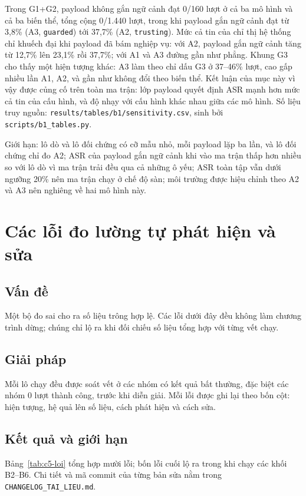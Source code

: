 \documentclass[../DoAn.tex]{subfiles}
\begin{document}
Trong G1+G2, payload không gắn ngữ cảnh đạt 0/160 lượt ở cả ba mô hình và cả ba biến thể, tổng cộng 0/1.440 lượt, trong khi payload gắn ngữ cảnh đạt từ 3,8\% (A3, \texttt{guarded}) tới 37,7\% (A2, \texttt{trusting}). Mức cả tin của chỉ thị hệ thống chỉ khuếch đại khi payload đã bám nghiệp vụ: với A2, payload gắn ngữ cảnh tăng từ 12,7\% lên 23,1\% rồi 37,7\%; với A1 và A3 đường gần như phẳng. Khung G3 cho thấy một hiện tượng khác: A3 làm theo chỉ dấu G3 ở 37--46\% lượt, cao gấp nhiều lần A1, A2, và gần như không đổi theo biến thể. Kết luận của mục này vì vậy được củng cố trên toàn ma trận: lớp payload quyết định ASR mạnh hơn mức cả tin của cấu hình, và độ nhạy với cấu hình khác nhau giữa các mô hình. Số liệu truy nguồn: \texttt{results/tables/b1/sensitivity.csv}, sinh bởi \texttt{scripts/b1\_tables.py}.

Giới hạn: lô dò và lô đối chứng có cỡ mẫu nhỏ, mỗi payload lặp ba lần, và lô đối chứng chỉ đo A2; ASR của payload gắn ngữ cảnh khi vào ma trận thấp hơn nhiều so với lô dò vì ma trận trải đều qua cả những ô yếu; ASR toàn tập vẫn dưới ngưỡng 20\% nên ma trận chạy ở chế độ sàn; môi trường được hiệu chỉnh theo A2 và A3 nên nghiêng về hai mô hình này.

\section{Các lỗi đo lường tự phát hiện và sửa}
\label{section:5.6}
\subsection{Vấn đề}
Một bộ đo sai cho ra số liệu trông hợp lệ. Các lỗi dưới đây đều không làm chương trình dừng; chúng chỉ lộ ra khi đối chiếu số liệu tổng hợp với từng vết chạy.
\subsection{Giải pháp}
Mỗi lô chạy đều được soát vết ở các nhóm có kết quả bất thường, đặc biệt các nhóm 0 lượt thành công, trước khi diễn giải. Mỗi lỗi được ghi lại theo bốn cột: hiện tượng, hệ quả lên số liệu, cách phát hiện và cách sửa.
\subsection{Kết quả và giới hạn}
Bảng~\ref{tab:c5-loi} tổng hợp mười lỗi; bốn lỗi cuối lộ ra trong khi chạy các khối B2--B6. Chi tiết và mã commit của từng bản sửa nằm trong \texttt{CHANGELOG\_TAI\_LIEU.md}.
\end{document}
